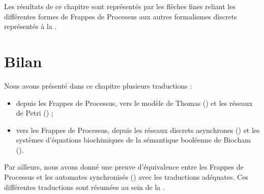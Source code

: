 Les résultats de ce chapitre sont représentés par les flèches fines reliant
les différentes formes de Frappes de Processus
aux autres formalismes discrets représentés à la .















% 


\section{Bilan}
Nous avons présenté dans ce chapitre plusieurs traductions :
\begin{itemize}
  \item depuis les Frappes de Processus,
    vers le modèle de Thomas ()
    et les réseaux de Petri () ;
  \item vers les Frappes de Processus,
    depuis les réseaux discrets asynchrones ()
    et les systèmes d'équations biochimiques de la sémantique booléenne de Biocham
    ().
\end{itemize}
Par ailleurs, nous avons donné une preuve d'équivalence entre les Frappes de Processus
et les automates synchronisés () avec les traductions adéquates.
Ces différentes traductions sont résumées au sein de la .

